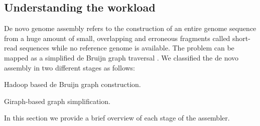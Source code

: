 \documentclass[conference]{IEEEtran}
\begin{document}
\subsection {Understanding the workload} \label{TheWorkload}
De novo genome assembly refers to the construction of an entire genome sequence from a huge amount of small, overlapping and erroneous fragments called short-read sequences while no reference genome is available.
The problem can be mapped as a simplified de Bruijn graph traversal \cite{bio:debruijngraph}. 
We classified the de novo assembly in two different stages as follows:
\begin{inparaenum}
\item Hadoop based de Bruijn graph construction. 
\item Giraph-based graph simplification. 
\end{inparaenum}
In this section we provide a brief overview of each stage of the assembler.
\end{document}
